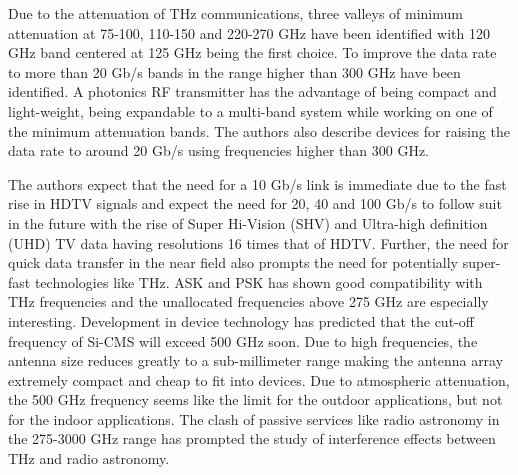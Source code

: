 \documentclass[12pt, letterpaper]{article}
\begin{document}
\par
Due to the attenuation of THz communications, three valleys of minimum attenuation at 75-100, 110-150 and 220-270 GHz have been identified with 120 GHz band centered at 125 GHz being the first choice. To improve the data rate to more than 20 Gb/s bands in the range higher than 300 GHz have been identified. A photonics RF transmitter has the advantage of being compact and light-weight, being expandable to a multi-band system while working on one of the minimum attenuation bands. The authors also describe devices for raising the data rate to around 20 Gb/s using frequencies higher than 300 GHz.
\par
The authors expect that the need for a 10 Gb/s link is immediate due to the fast rise in HDTV signals and expect the need for 20, 40 and 100 Gb/s to follow suit in the future with the rise of Super Hi-Vision (SHV) and Ultra-high definition (UHD) TV data having resolutions 16 times that of HDTV. Further, the need for quick data transfer in the near field also prompts the need for potentially super-fast technologies like THz. ASK and PSK has shown good compatibility with THz frequencies and the unallocated frequencies above 275 GHz are especially interesting. Development in device technology has predicted that the cut-off frequency of Si-CMS will exceed 500 GHz soon. Due to high frequencies, the antenna size reduces greatly to a sub-millimeter range making the antenna array extremely compact and cheap to fit into devices. Due to atmospheric attenuation, the 500 GHz frequency seems like the limit for the outdoor applications, but not for the indoor applications. The clash of passive services like radio astronomy in the 275-3000 GHz range has prompted the study of interference effects between THz and radio astronomy. 
\end{document}
